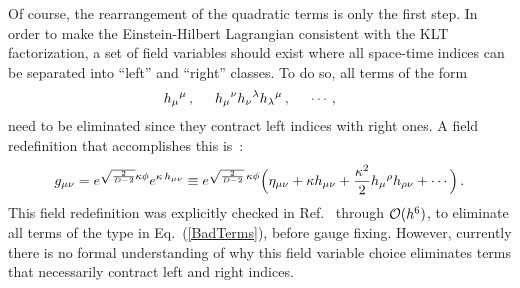 Of course, the rearrangement of the quadratic terms is only the first
step.  In order to make the Einstein-Hilbert Lagrangian consistent
with the KLT factorization, a set of field variables should exist where
all space-time indices can be separated into ``left'' and ``right''
classes. To do so, all terms of the form
%
\begin{equation}
h_{\mu}{}^{\mu}\, , \hskip .5 cm 
h_{\mu}{}^{\nu} h_{\nu}{}^{\lambda} h_{\lambda}{}^{\mu} \,, \hskip .5 cm 
\cdots, \hskip .5 cm
\label{BadTerms}
\end{equation}
%
need to be eliminated since they contract left indices with right
 ones.  A field redefinition that accomplishes this
 is~\cite{BernGrant}:
\begin{equation}
g_{\mu\nu}  = e^{\sqrt{\frac{2}{D-2}} \kappa \phi} e^{\kappa\, h_{\mu\nu}} 
 \equiv 
 e^{\sqrt{\frac{2}{D-2}} \,\kappa \phi} 
\Bigl(\eta_{\mu\nu} + \kappa h_{\mu\nu} + {\textstyle \kappa^2\over 2} 
                    h_{\mu}{}^{\rho} h_{\rho\nu} + \cdots \Bigr) \,. 
\end{equation}
%
This field redefinition was explicitly checked in
Ref.~\cite{BernGrant} through ${\cal O}(h^6)$, to eliminate all terms
of the type in Eq.~(\ref{BadTerms}), before gauge fixing.  However,
currently there is no formal understanding of why this field variable
choice eliminates terms that necessarily contract left and right
indices.

